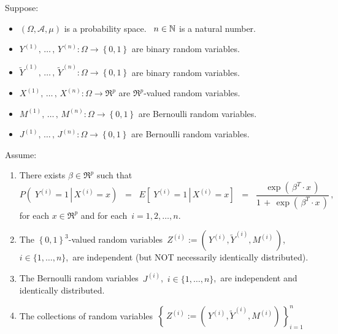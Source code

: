 \vskip 0.5cm
\begin{theorem}\label{ThmLogisticRegressionWithIncorrectData}
\mbox{}\vskip 0.1cm\noindent
Suppose:
\begin{itemize}
\item
	$\left(\Omega,\mathcal{A},\mu\right)$ is a probability space.
	\,
	$n \in \mathbb{N}$ is a natural number.
\item
	$Y^{(1)}, \,\ldots\,,\, Y^{(n)} : \Omega \longrightarrow \left\{0,1\right\}$
	are binary random variables.
\item
	$\widetilde{Y}^{(1)}, \,\ldots\,,\, \widetilde{Y}^{(n)} : \Omega \longrightarrow \left\{0,1\right\}$
	are binary random variables.
\item
	$X^{(1)}, \,\ldots\,,\, X^{(n)} : \Omega \longrightarrow \Re^{p}$
	are $\Re^{p}$-valued random variables.
\item
	$M^{(1)}, \,\ldots\,,\, M^{(n)} : \Omega \longrightarrow \left\{0,1\right\}$
	are Bernoulli random variables.
\item
	$J^{(1)}, \,\ldots\,,\, J^{(n)} : \Omega \longrightarrow \left\{0,1\right\}$
	are Bernoulli random variables.
\end{itemize}
Assume:
\renewcommand{\theenumi}{\alph{enumi}}
\renewcommand{\labelenumi}{\textnormal{(\theenumi)}$\;\;$}
\begin{enumerate}
\item
	There exists $\beta \in \Re^{p}$ such that
	\begin{equation*}
		P\!\left(\; Y^{(i)} = 1 \,\left\vert\, X^{(i)} = x \right.\right)
	\;\; = \;\;
		E\!\left[\; Y^{(i)}  = 1 \,\left\vert\, X^{(i)} = x \right.\right]
	\;\; = \;\;
		\dfrac{
			\exp\!\left(\,\beta^{T} \cdot x \,\right)
			}{
			1 \,+\, \exp\!\left(\,\beta^{T} \cdot x \,\right)
			}\,,
	\quad
	\end{equation*}
	for each $x \in \Re^{p}$ and for each \,$i = 1,2,\ldots,n$.
\item\label{iIndependence}
	The $\left\{0,1\right\}^{3}$-valued random variables
	\,$Z^{(i)} := \left(\,Y^{(i)},\widetilde{Y}^{(i)},M^{(i)}\,\right)$,
	\,$i \in \{1, \ldots, n\}$,
	\,are independent (but NOT necessarily identically distributed).
\item\label{Jindependence}
	The Bernoulli random variables \,$J^{(i)}$, \,$i \in \{1, \ldots, n\}$, \,are independent and identically distributed.
\item\label{ZJindependence}
	The collections of random variables
	\,$\left\{\,Z^{(i)} := \left(\,Y^{(i)},\widetilde{Y}^{(i)},M^{(i)}\right)\,\right\}_{i=1}^{n}$\,

\end{enumerate}
\end{theorem}
